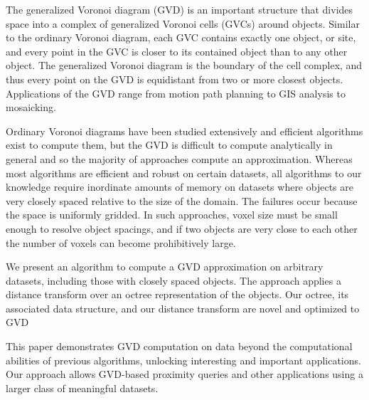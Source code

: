 \documentclass{egpubl}
\begin{document}
%

The generalized Voronoi diagram (GVD) is an important structure that divides space into a complex of generalized Voronoi cells (GVCs) around objects.  Similar to the ordinary Voronoi diagram, each GVC contains exactly one object, or site, and every point in the GVC is closer to its contained object than to any other object.  The generalized Voronoi diagram is the boundary of the cell complex, and thus every point on the GVD is equidistant from two or more closest objects.  Applications of the GVD range from motion path planning to GIS analysis to mosaicking.

Ordinary Voronoi diagrams have been studied extensively and efficient algorithms exist to compute them, but the GVD is difficult to compute analytically in general \cite{boissonnat2006curved,hoff1999fast} and so the majority of approaches compute an approximation.  Whereas most algorithms are efficient and robust on certain datasets, all algorithms to our knowledge require inordinate amounts of memory on datasets where objects are very closely spaced relative to the size of the domain.  The failures occur because the space is uniformly gridded.  In such approaches, voxel size must be small enough to resolve object spacings, and if two objects are very close to each other the number of voxels can become prohibitively large.

We present an algorithm to compute a GVD approximation on arbitrary datasets, including those with closely spaced objects.  The approach applies a distance transform over an octree representation of the objects.  Our octree, its associated data structure, and our distance transform are novel and optimized to GVD 

This paper demonstrates GVD computation on data beyond the computational abilities of previous algorithms, unlocking interesting and important applications.  Our approach allows GVD-based proximity queries and other applications using a larger class of meaningful datasets.
\end{document}
